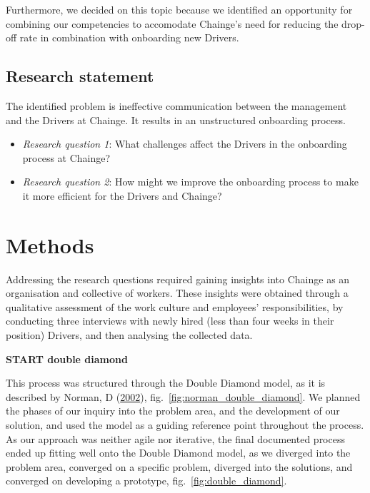 Furthermore, we decided on this topic because we identified an
opportunity for combining our competencies to accomodate Chainge's need
for reducing the drop-off rate in combination with onboarding new
Drivers.

\hypertarget{sec:research_statement}{%
\subsection{Research statement}\label{sec:research_statement}}

The identified problem is ineffective communication between the
management and the Drivers at Chainge. It results in an unstructured
onboarding process.

\begin{itemize}
\tightlist
\item
  \emph{Research question 1}: What challenges affect the Drivers in the
  onboarding process at Chainge?
\item
  \emph{Research question 2}: How might we improve the onboarding
  process to make it more efficient for the Drivers and Chainge?
\end{itemize}

\hypertarget{sec:methods}{%
\section{Methods}\label{sec:methods}}

Addressing the research questions required gaining insights into Chainge
as an organisation and collective of workers. These insights were
obtained through a qualitative assessment of the work culture and
employees' responsibilities, by conducting three interviews with newly
hired (less than four weeks in their position) Drivers, and then
analysing the collected data.

\textbf{START double diamond}

This process was structured through the Double Diamond model, as it is
described by Norman, D (\protect\hyperlink{ref-norman2002design}{2002}),
fig.~\ref{fig:norman_double_diamond}. We planned the phases of our
inquiry into the problem area, and the development of our solution, and
used the model as a guiding reference point throughout the process. As
our approach was neither agile nor iterative, the final documented
process ended up fitting well onto the Double Diamond model, as we
diverged into the problem area, converged on a specific problem,
diverged into the solutions, and converged on developing a prototype,
fig.~\ref{fig:double_diamond}.

